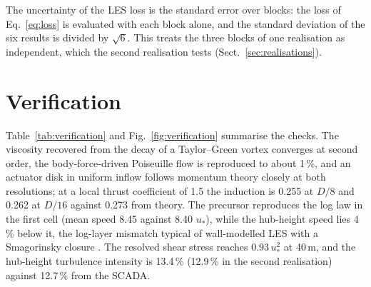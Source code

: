 \documentclass[11pt,a4paper]{article}
\begin{document}
The uncertainty of the LES loss is the standard error over blocks: the loss of Eq.~\eqref{eq:loss} is evaluated
with each block alone, and the standard deviation of the six results is divided by $\sqrt 6$. This treats the
three blocks of one realisation as independent, which the second realisation tests (Sect.~\ref{sec:realisations}).

\section{Verification}
\label{sec:verification}

Table~\ref{tab:verification} and Fig.~\ref{fig:verification} summarise the checks. The viscosity recovered from
the decay of a Taylor--Green vortex converges at second order, the body-force-driven Poiseuille flow is reproduced
to about 1\,\%, and an actuator disk in uniform inflow follows momentum theory closely at both resolutions; at a
local thrust coefficient of 1.5 the induction is 0.255 at $D/8$ and 0.262 at $D/16$ against 0.273 from theory.
The precursor reproduces the log law in the first cell (mean speed 8.45 against 8.40 $u_*$), while the hub-height
speed lies 4\,\% below it, the log-layer mismatch typical of wall-modelled LES with a Smagorinsky closure
\citep{brasseur2010loglayer}. The resolved shear stress reaches 0.93\,$u_*^2$ at 40\,m, and the hub-height
turbulence intensity is 13.4\,\% (12.9\,\% in the second realisation) against 12.7\,\% from the SCADA.
\end{document}
